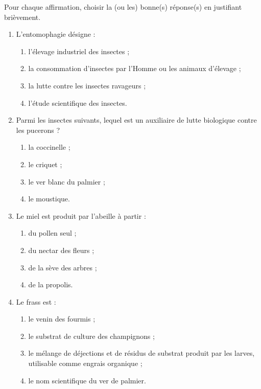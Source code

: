 \documentclass[11pt]{article}
\newcommand{\cle}[1]{{\popxbold\color{popdark}#1}}
\begin{document}
\begin{exercice}
Pour chaque affirmation, choisir la (ou les) bonne(s) réponse(s) en justifiant brièvement.
\begin{enumerate}
\item L'entomophagie désigne :
\begin{enumerate}
\item l'élevage industriel des insectes ;
\item la consommation d'insectes par l'Homme ou les animaux d'élevage ;
\item la lutte contre les insectes ravageurs ;
\item l'étude scientifique des insectes.
\end{enumerate}
\item Parmi les insectes suivants, lequel est un \cle{auxiliaire} de lutte biologique contre les pucerons ?
\begin{enumerate}
\item la coccinelle ; \item le criquet ; \item le ver blanc du palmier ; \item le moustique.
\end{enumerate}
\item Le miel est produit par l'abeille à partir :
\begin{enumerate}
\item du pollen seul ; \item du nectar des fleurs ; \item de la sève des arbres ; \item de la propolis.
\end{enumerate}
\item Le \cle{frass} est :
\begin{enumerate}
\item le venin des fourmis ; \item le substrat de culture des champignons ;
\item le mélange de déjections et de résidus de substrat produit par les larves, utilisable comme engrais organique ;
\item le nom scientifique du ver de palmier.
\end{enumerate}
\end{enumerate}
\end{exercice}
\end{document}
